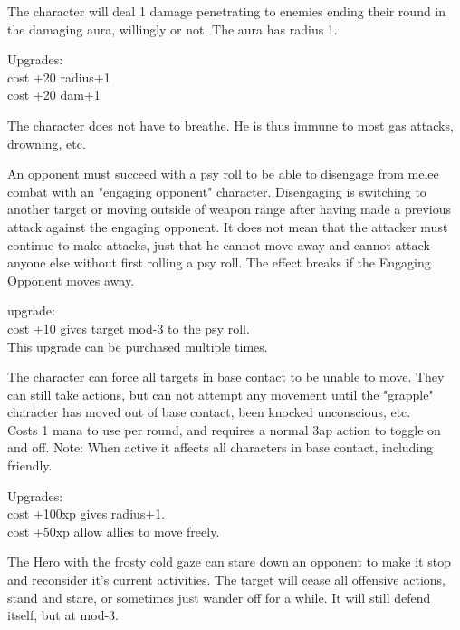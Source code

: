  The character will deal 1 damage penetrating to enemies ending their round in the damaging aura, willingly or not. The aura has radius 1.


Upgrades:\\
cost +20 radius+1 \\
cost +20 dam+1


 The character does not have to breathe. He is thus immune to most gas attacks, drowning, etc.


 An opponent must succeed with a psy roll to be able to disengage from melee combat with an "engaging opponent" character. Disengaging is switching to another target or moving outside of weapon range after having made a previous attack against the engaging opponent. It does not mean that the attacker must continue to make attacks, just that he cannot move away and cannot attack anyone else without first rolling a psy roll.
The effect breaks if the Engaging Opponent moves away.

upgrade: \\
cost +10 gives target mod-3 to the psy roll. \\
This upgrade can be purchased multiple times.


 The character can force all targets in base contact to be unable to move. They can still take actions, but can not attempt any movement until the "grapple" character has moved out of base contact, been knocked unconscious, etc. \\
Costs 1 mana to use per round, and requires a normal 3ap action to toggle on and off. Note: When active it affects all characters in base contact, including friendly.

Upgrades: \\
cost +100xp gives radius+1.\\
cost +50xp allow allies to move freely.


 The Hero with the frosty cold gaze can stare down an opponent to make it stop and reconsider it's current activities. The target will cease all offensive actions, stand and stare, or sometimes just wander off for a while. It will still defend itself, but at mod-3.

